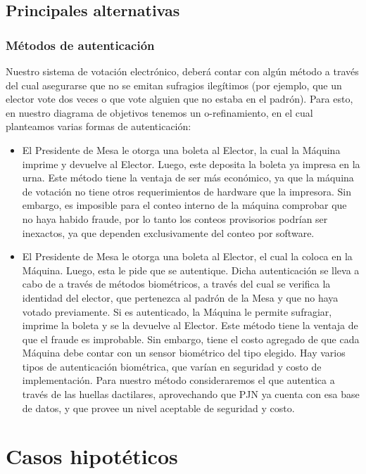 \documentclass[spanish, 10pt,a4paper]{article}
\numberwithin{equation}{section} %
\begin{document}
\subsection{Principales alternativas}
\subsubsection{Métodos de autenticación}

	Nuestro sistema de votación electrónico, deberá contar con algún método a través del cual asegurarse que no se emitan sufragios ilegítimos (por ejemplo, que un elector vote dos veces o que vote alguien que no estaba en el padrón). Para esto, en nuestro diagrama de objetivos tenemos un o-refinamiento, en el cual planteamos varias formas de autenticación: 

	\begin{itemize}

		\item El Presidente de Mesa le otorga una boleta al Elector, la cual la Máquina imprime y devuelve al Elector. Luego, este deposita la boleta ya impresa en la urna. Este método tiene la ventaja de ser más económico, ya que la máquina de votación no tiene otros requerimientos de hardware que la impresora. Sin embargo, es imposible para el conteo interno de la máquina comprobar que no haya habido fraude, por lo tanto los conteos provisorios podrían ser inexactos, ya que dependen exclusivamente del conteo por software.
		\item El Presidente de Mesa le otorga una boleta al Elector, el cual la coloca en la Máquina. Luego, esta le pide que se autentique. Dicha autenticación se lleva a cabo de a través de métodos biométricos, a través del cual se verifica la identidad del elector, que pertenezca al padrón de la Mesa y que no haya votado previamente. Si es autenticado, la Máquina le permite sufragiar, imprime la boleta y se la devuelve al Elector. Este método tiene la ventaja de que el fraude es improbable. Sin embargo, tiene el costo agregado de que cada Máquina debe contar con un sensor biométrico del tipo elegido. Hay varios tipos de autenticación biométrica, que varían en seguridad y costo de implementación. Para nuestro método consideraremos el que autentica a través de las huellas dactilares, aprovechando que PJN ya cuenta con esa base de datos, y que provee un nivel aceptable de seguridad y costo.
	\end{itemize}


\section{Casos hipotéticos}
\end{document}
